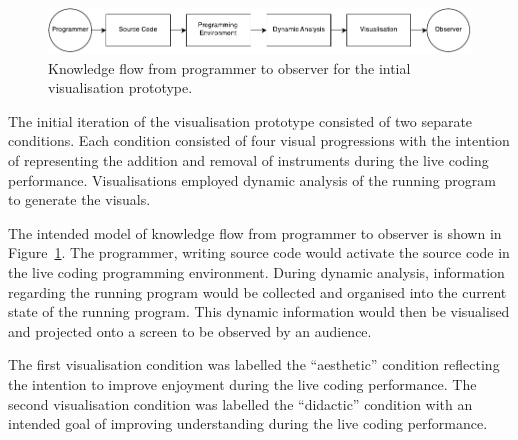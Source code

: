 \begin{figure}
  \centering \includegraphics[width=\columnwidth]{../images/diagrams/knowledge-flow-initial.pdf}
  \caption{Knowledge flow from programmer to observer for the intial visualisation prototype.}
\label{fig:knowledge-flow-initial}
\end{figure}

The initial iteration of the visualisation prototype consisted of two separate conditions. Each condition consisted of four visual progressions with the intention of representing the addition and removal of instruments during the live coding performance. Visualisations employed dynamic analysis of the running program to generate the visuals. 

The intended model of knowledge flow from programmer to observer is shown in Figure~\ref{fig:knowledge-flow-initial}. The programmer, writing source code would activate the source code in the live coding programming environment. During dynamic analysis, information regarding the running program would be collected and organised into the current state of the running program. This dynamic information would then be visualised and projected onto a screen to be observed by an audience. 

The first visualisation condition was labelled the ``aesthetic'' condition reflecting the intention to improve enjoyment during the live coding performance. The second visualisation condition was labelled the ``didactic'' condition with an intended goal of improving understanding during the live coding performance.





